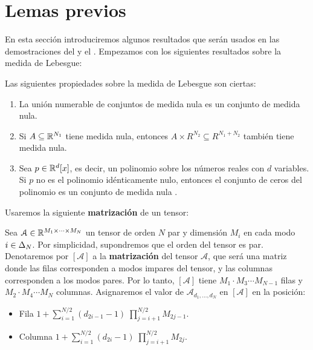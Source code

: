 \section{Lemas previos} \label{sec:lemas_previos}

En esta sección introduciremos algunos resultados que serán usados en las demostraciones del  y el . Empezamos con los siguientes resultados sobre la medida de Lebesgue:

\begin{lema} \label{lema:prop_fundamentales_medida} Las siguientes propiedades sobre la medida de Lebesgue son ciertas:

\begin{enumerate}
    \item La unión numerable de conjuntos de medida nula es un conjunto de medida nula.
    \item Si $A \subseteq \mathbb{R}^{N_1}$ tiene medida nula, entonces $A \times R^{N_2} \subseteq R^{N_1 + N_2}$ también tiene medida nula.
    \item Sea $p \in \mathbb{R}^d[x]$, es decir, un polinomio sobre los números reales con $d$ variables. Si $p$ no es el polinomio idénticamente nulo, entonces el conjunto de ceros del polinomio es un conjunto de medida nula \cite{informatica:zeros_of_polynomial}.
\end{enumerate}

\end{lema}

Usaremos la siguiente \textbf{matrización} de un tensor:

\begin{definicion}

Sea $\mathcal{A} \in \mathbb{R}^{M_1 \times \cdots \times M_N}$ un tensor de orden $N$ par y dimensión $M_i$ en cada modo $i \in \Delta_{N}$. Por simplicidad, supondremos que el orden del tensor es par. Denotaremos por $[\mathcal{A}]$ a la \textbf{matrización} del tensor $\mathcal{A}$, que será una matriz donde las filas corresponden a modos impares del tensor, y las columnas corresponden a los modos pares. Por lo tanto, $[\mathcal{A}]$ tiene $M_1 \cdot M_3 \cdots M_{N-1}$ filas y $M_2 \cdot M_4 \cdots M_N$ columnas. Asignaremos el valor de $\mathcal{A}_{d_1, \ldots, d_N}$ en $[\mathcal{A}]$ en la posición:

\begin{itemize}
    \item Fila $1 + \sum_{i = 1}^{N/2} (d_{2i - 1} - 1) \; \prod_{j = i + 1}^{N/2} M_{2j - 1}$.
    \item Columna $1 + \sum_{i = 1}^{N/2} (d_{2i} - 1) \; \prod_{j = i + 1}^{N/2} M_{2j}$.
\end{itemize}

\end{definicion}

